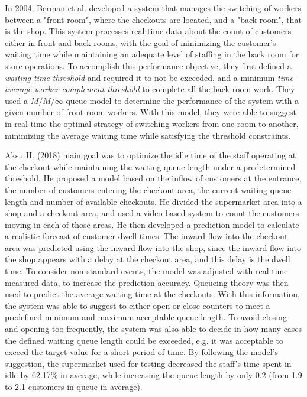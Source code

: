 In 2004, Berman et al. \cite{berman} developed a system that manages the switching of workers between a "front room", where the checkouts are located, and a "back room", that is the shop. This system processes real-time data about the count of customers either in front and back rooms, with the goal of minimizing the customer's waiting time while maintaining an adequate level of staffing in the back room for store operations. To accomplish this performance objective, they first defined a \emph{waiting time threshold} and required it to not be exceeded, and a minimum \emph{time-average worker complement threshold} to complete all the back room work. They used a \( M/M/\infty \) queue model to determine the performance of the system with a given number of front room workers. With this model, they were able to suggest in real-time the optimal strategy of switching workers from one room to another, minimizing the average waiting time while satisfying the threshold constraints.

Aksu H. (2018) \cite{aksu} main goal was to optimize the idle time of the staff operating at the checkout while maintaining the waiting queue length under a predetermined threshold. He proposed a model based on the inflow of customers at the entrance, the number of customers entering the checkout area, the current waiting queue length and number of available checkouts. He divided the supermarket area into a shop and a checkout area, and used a video-based system to count the customers moving in each of those areas. He then developed a prediction model to calculate a realistic forecast of customer dwell times. The inward flow into the checkout area was predicted using the inward flow into the shop, since the inward flow into the shop appears with a delay at the checkout area, and this delay is the dwell time. To consider non-standard events, the model was adjusted with real-time measured data, to increase the prediction accuracy. Queueing theory was then used to predict the average waiting time at the checkouts. With this information, the system was able to suggest to either open or close counters to meet a predefined minimum and maximum acceptable queue length. To avoid closing and opening too frequently, the system was also able to decide in how many cases the defined waiting queue length could be exceeded, e.g. it was acceptable to exceed the target value for a short period of time. By following the model’s suggestion, the supermarket used for testing decreased the staff’s time spent in idle by 62.17\% in average, while increasing the queue length by only 0.2 (from 1.9 to 2.1 customers in queue in average).

